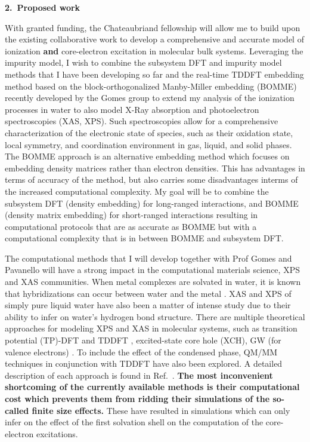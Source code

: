 \documentclass[notitlepage,12pt]{report}
\begin{document}
\textbf{\large 2.\ Proposed work}
    
    With granted funding, the Chateaubriand fellowship will allow me to build upon the existing collaborative work to develop a comprehensive and accurate model of ionization {\bf and } core-electron excitation in molecular bulk systems. Leveraging the impurity model, I wish to combine the subsystem DFT and impurity model methods that I have been developing so far and the real-time TDDFT embedding method based on the block-orthogonalized Manby-Miller embedding (BOMME) \supercite{ding2017embedded,koh2017accelerating} recently  developed by the Gomes group \supercite{De_Santis_2020,de2021environment} to extend my analysis of the ionization processes in water to also model X-Ray absorption and photoelectron spectroscopies (XAS, XPS)\supercite{fransson2016x}. Such spectroscopies  allow for a comprehensive characterization of the electronic state of species, such as their oxidation state, local symmetry, and coordination environment in gas, liquid, and solid phases\supercite{rehr2005progress,koningsberger1987x}. The BOMME approach is an alternative embedding method which focuses on embedding density matrices rather than electron densities. This has advantages in terms of accuracy of the method, but also carries some disadvantages interms of the increased computational complexity. My goal will be to combine the subsystem DFT (density embedding) for long-ranged interactions, and BOMME (density matrix embedding) for short-ranged interactions resulting in computational protocols that are as accurate as BOMME but with a computational complexity that is in between BOMME and subsystem DFT.

    The computational methods that I will develop together with Prof Gomes and Pavanello will have a strong impact in the computational materials science,  XPS and XAS communities. When metal complexes are solvated in water, it is known that hybridizations can occur between water and the metal \supercite{N_slund_2003}.  XAS and XPS of simply pure liquid water have also been a matter of intense study \supercite{fransson2016x} due to their ability to infer on water's hydrogen bond structure. There are multiple theoretical approaches for modeling XPS and XAS in molecular systems, such as transition potential (TP)-DFT  and TDDFT \supercite{triguero1998calculations}, excited-state core hole (XCH)\supercite{prendergast2006x}, GW (for valence electrons) \supercite{vinson2012theoretical,chen2010x}. To include the effect of the condensed phase, QM/MM techniques in conjunction with TDDFT have also been explored.\supercite{list2014lanczos} A detailed description of each approach is found in Ref.\ \cite{fransson2016x}. {\bf The most inconvenient shortcoming of the currently available methods is their computational cost which prevents them from ridding their simulations of the so-called finite size effects.} These have resulted in simulations which can only infer on the effect of the first solvation shell on the computation of the core-electron excitations\supercite{de2021environment}. 
\end{document}
